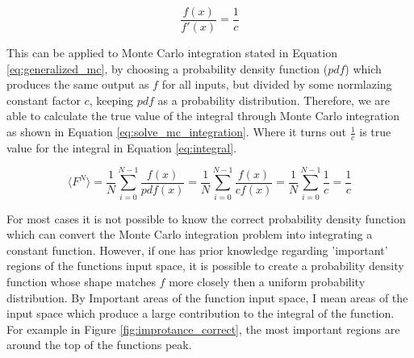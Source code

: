 \documentclass[ %
                    author={Callum Pearce},
                supervisor={Dr. Neill Campbell},
                    degree={MEng},
                     title={How effective are Temporal difference learning methods for reducing the number of zero contribution light paths while still accurately approximating Global Illumination in Path tracing?},
                  subtitle={},
                      type={research},
                      year={2019} ]{dissertation}
\begin{document}
\begin{equation}
\label{eq:constant_conversion}
\frac{f(x)}{f'(x)} = \frac{1}{c}
\end{equation}

This can be applied to Monte Carlo integration stated in Equation \ref{eq:generalized_mc}, by choosing a probability density function ($pdf$) which produces the same output as $f$ for all inputs, but divided by some normlazing constant factor $c$, keeping $pdf$ as a probability distribution. Therefore, we are able to calculate the true value of the integral through Monte Carlo integration as shown in Equation \ref{eq:solve_mc_integration}. Where it turns out $\frac{1}{c}$ is true value for the integral in Equation \ref{eq:integral}.

\begin{equation}
\label{eq:solve_mc_integration}
\langle F^N \rangle = \frac{1}{N} \sum^{N-1}_{i=0} \frac{f(x)}{pdf(x)} = \frac{1}{N} \sum^{N-1}_{i=0} \frac{f(x)}{cf(x)} =  \frac{1}{N} \sum^{N-1}_{i=0} \frac{1}{c} = \frac{1}{c}
\end{equation}

For most cases it is not possible to know the correct probability density function which can convert the Monte Carlo integration problem into integrating a constant function. However, if one has prior knowledge regarding 'important' regions of the functions input space, it is possible to create a probability density function whose shape matches $f$ more closely then a uniform probability distribution. By Important areas of the function input space, I mean areas of the input space which produce a large contribution to the integral of the function. For example in Figure \ref{fig:improtance_correct}, the most important regions are around the top of the functions peak. 
\end{document}
